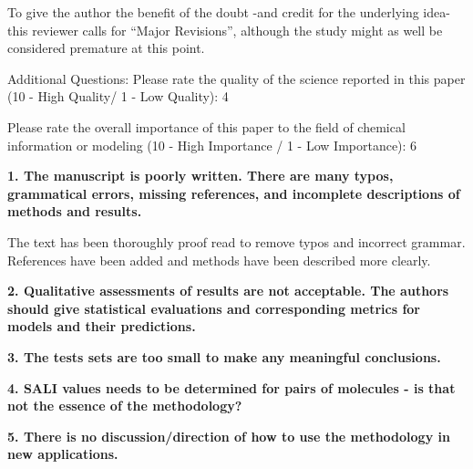 \documentclass[letterpaper, 12pt]{article}
\begin{document}
To give the author the benefit of the doubt -and credit for the underlying idea- this reviewer calls for “Major Revisions”, although the study might as well be considered premature at this point. 

Additional Questions:
Please rate the quality of the science reported in this paper (10 - High Quality/ 1 - Low Quality): 4

Please rate the overall importance of this paper to the field of chemical information or modeling (10 - High Importance / 1 - Low Importance): 6


\textbf{1.  The manuscript is poorly written.  There are many typos, grammatical errors, missing
  references, and incomplete descriptions of methods and results.}

The text has been thoroughly proof read to remove typos and incorrect grammar. References have been
added and methods have been described more clearly.

\textbf{2.  Qualitative assessments of results are not acceptable.  The authors should give
  statistical evaluations and corresponding metrics for models and their predictions.}

\textbf{3.  The tests sets are too small to make any meaningful conclusions.}

\textbf{4.  SALI values needs to be determined for pairs of molecules - is that not the essence of
  the methodology?}

\textbf{5.  There is no discussion/direction of how to use the methodology in new applications.}
\end{document}
